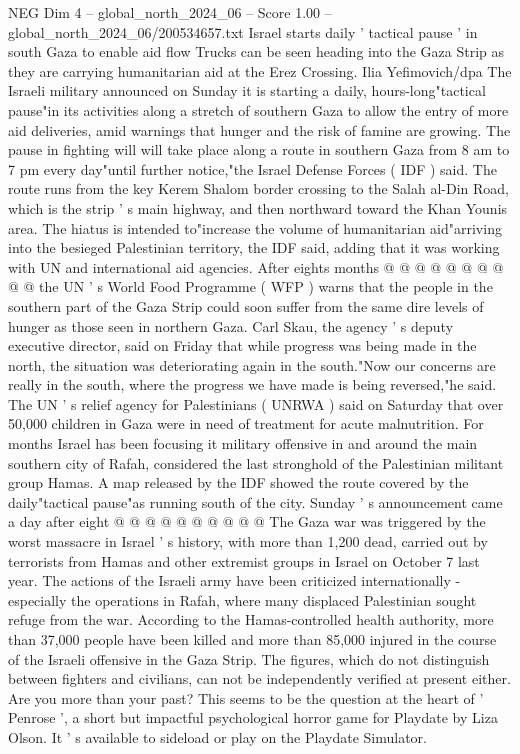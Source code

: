 \begin{textsample}{NEG Dim 4 – global\_north\_2024\_06 – Score 1.00 – global\_north\_2024\_06/200534657.txt}  \label{ex:f4_neg_328}
Israel starts daily ' tactical pause ' in south Gaza to enable aid flow Trucks can be seen heading into the Gaza Strip as they are carrying humanitarian aid at the Erez Crossing.
Ilia Yefimovich/dpa The Israeli military announced on Sunday it is starting a daily, hours-long"tactical pause"in its activities along a stretch of southern Gaza to allow the entry of more aid deliveries, amid warnings that hunger and the risk of famine are growing.
The pause in fighting will will take place along a route in southern Gaza from 8 am to 7 pm every day"until further notice,"the Israel Defense Forces ( IDF ) said.
The route runs from the key Kerem Shalom border crossing to the Salah al-Din Road, which is the strip ' s main highway, and then northward toward the Khan Younis area.
The hiatus is intended to"increase the volume of humanitarian aid"arriving into the besieged Palestinian territory, the IDF said, adding that it was working with UN and international aid agencies.
After eights months @ @ @ @ @ @ @ @ @ @ the UN ' s World Food Programme ( WFP ) warns that the people in the southern part of the Gaza Strip could soon suffer from the same dire levels of hunger as those seen in northern Gaza.
Carl Skau, the agency ' s deputy executive director, said on Friday that while progress was being made in the north, the situation was deteriorating again in the south."Now our concerns are really in the south, where the progress we have made is being reversed,"he said.
The UN ' s relief agency for Palestinians ( UNRWA ) said on Saturday that over 50,000 children in Gaza were in need of treatment for acute malnutrition.
For months Israel has been focusing it military offensive in and around the main southern city of Rafah, considered the last stronghold of the Palestinian militant group Hamas.
A map released by the IDF showed the route covered by the daily"tactical pause"as running south of the city.
Sunday ' s announcement came a day after eight @ @ @ @ @ @ @ @ @ @ The Gaza war was triggered by the worst massacre in Israel ' s history, with more than 1,200 dead, carried out by terrorists from Hamas and other extremist groups in Israel on October 7 last year.
The actions of the Israeli army have been criticized internationally - especially the operations in Rafah, where many displaced Palestinian sought refuge from the war.
According to the Hamas-controlled health authority, more than 37,000 people have been killed and more than 85,000 injured in the course of the Israeli offensive in the Gaza Strip.
The figures, which do not distinguish between fighters and civilians, can not be independently verified at present either.
Are you more than your past?
This seems to be the question at the heart of ' Penrose ', a short but impactful psychological horror game for Playdate by Liza Olson.
It ' s available to sideload or play on the Playdate Simulator.

\end{textsample}
